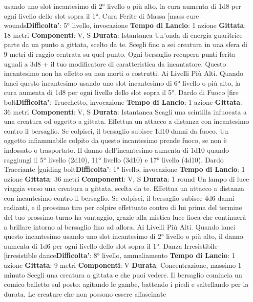 \begin{multicols}{2}
usando uno slot incantesimo di 2° livello o più alto, la
cura aumenta di 1d8 per ogni livello dello slot sopra il
1°.
Cura Ferite di Massa
[mass cure wounds\textbf{Difficolta'}:
5° livello, invocazione
\textbf{Tempo di Lancio}: 1 azione
\textbf{Gittata}: 18 metri
\textbf{Componenti}: V, S
\textbf{Durata}: Istantanea
Un’onda di energia guaritrice parte da un punto a
gittata, scelto da te. Scegli fino a sei creatura in una
sfera di 9 metri di raggio centrata su quel punto. Ogni
bersaglio recupera punti ferita uguali a 3d8 + il tuo
modificatore di caratteristica da incantatore. Questo
incantesimo non ha effetto su non morti o costrutti.
Ai Livelli Più Alti. Quando lanci questo incantesimo
usando uno slot incantesimo di 6° livello o più alto, la
cura aumenta di 1d8 per ogni livello dello slot sopra il
5°.
Dardo di Fuoco
[fire bolt\textbf{Difficolta'}:
Trucchetto, invocazione
\textbf{Tempo di Lancio}: 1 azione
\textbf{Gittata}: 36 metri
\textbf{Componenti}: V, S
\textbf{Durata}: Istantanea
Scagli una scintilla infuocata a una creatura od oggetto
a gittata. Effettua un attacco a distanza con incantesimo
contro il bersaglio. Se colpisci, il bersaglio subisce 1d10
danni da fuoco. Un oggetto infiammabile colpito da
questo incantesimo prende fuoco, se non è indossato o
trasportato.
Il danno dell’incantesimo aumenta di 1d10 quando
raggiungi il 5° livello (2d10), 11° livello (3d10) e 17°
livello (4d10).
Dardo Tracciante
[guiding bolt\textbf{Difficolta'}:
1° livello, invocazione
\textbf{Tempo di Lancio}: 1 azione
\textbf{Gittata}: 36 metri
\textbf{Componenti}: V, S
\textbf{Durata}: 1 round
Un lampo di luce viaggia verso una creatura a gittata,
scelta da te. Effettua un attacco a distanza con
incantesimo contro il bersaglio. Se colpisci, il bersaglio
subisce 4d6 danni radianti, e il prossimo tiro per colpire
effettuato contro di lui prima del termine del tuo
prossimo turno ha vantaggio, grazie alla mistica luce
fioca che continuerà a brillare intorno al bersaglio fino
ad allora.
Ai Livelli Più Alti. Quando lanci questo incantesimo
usando uno slot incantesimo di 2° livello o più alto, il
danno aumenta di 1d6 per ogni livello dello slot sopra il
1°.
Danza Irresistibile
[irresistible dance\textbf{Difficolta'}:
8° livello, ammaliamento
\textbf{Tempo di Lancio}: 1 azione
\textbf{Gittata}: 9 metri
\textbf{Componenti}: V
\textbf{Durata}: Concentrazione, massimo 1 minuto
Scegli una creatura a gittata e che puoi vedere. Il
bersaglio comincia un comico balletto sul posto:
agitando le gambe, battendo i piedi e saltellando per la
durata. Le creature che non possono essere affascinate

\end{multicols}
